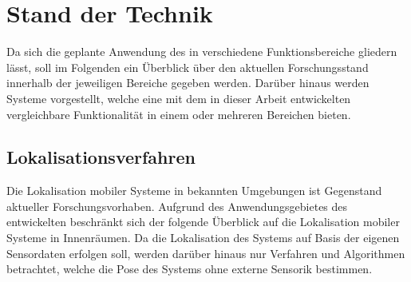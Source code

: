 \chapter{Stand der Technik}
\label{chap.tech}

Da sich die geplante Anwendung des  in verschiedene Funktionsbereiche gliedern lässt, soll im Folgenden ein Überblick über den aktuellen Forschungsstand innerhalb der jeweiligen Bereiche gegeben werden. Darüber hinaus werden Systeme vorgestellt, welche eine mit dem in dieser Arbeit entwickelten \kps{} vergleichbare Funktionalität in einem oder mehreren Bereichen bieten.

\section{Lokalisationsverfahren}
\label{chap:mcl}
Die Lokalisation mobiler Systeme in bekannten Umgebungen ist Gegenstand aktueller Forschungsvorhaben. Aufgrund des Anwendungsgebietes des entwickelten  beschränkt sich der folgende Überblick auf die Lokalisation mobiler Systeme in Innenräumen. Da die Lokalisation des Systems auf Basis der eigenen Sensordaten erfolgen soll, werden darüber hinaus nur Verfahren und Algorithmen betrachtet, welche die Pose des Systems ohne externe Sensorik bestimmen.\\

